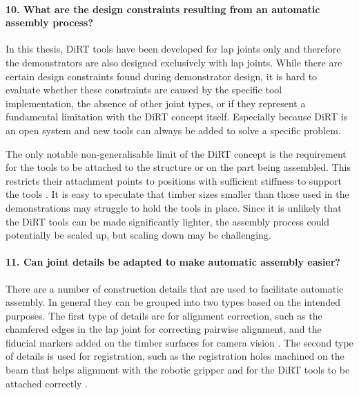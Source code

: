\paragraph{10. What are the design constraints resulting from an automatic assembly process?}

In this thesis, DiRT tools have been developed for lap joints only and therefore the demonstrators are also designed exclusively with lap joints. While there are certain design constraints found during demonstrator design, it is hard to evaluate whether these constraints are caused by the specific tool implementation, the absence of other joint types, or if they represent a fundamental limitation with the DiRT concept itself. Especially because DiRT is an open system and new tools can always be added to solve a specific problem.

The only notable non-generalisable limit of the DiRT concept is the requirement for the tools to be attached to the structure or on the part being assembled. This restricts their attachment points to positions with sufficient stiffness to support the tools . It is easy to speculate that timber sizes smaller than those used in the demonstrations may struggle to hold the tools in place. Since it is unlikely that the DiRT tools can be made significantly lighter, the assembly process could potentially be scaled up, but scaling down may be challenging.

\paragraph{11. Can joint details be adapted to make automatic assembly easier?}

There are a number of construction details that are used to facilitate automatic assembly. In general they can be grouped into two types based on the intended purposes. The first type of details are for alignment correction, such as the chamfered edges in the lap joint for correcting pairwise alignment, and the fiducial markers added on the timber surfaces for camera vision . The second type of details is used for registration, such as the registration holes machined on the beam that helps alignment with the robotic gripper and for the DiRT tools to be attached correctly .

